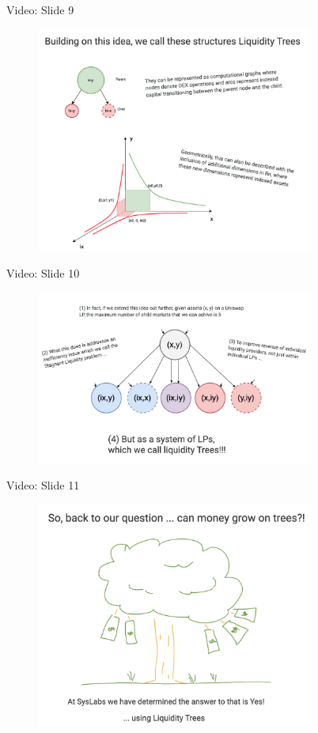 \documentclass[10pt,xcolor=svgnames]{beamer} %
\begin{document}
\begin{frame}{Video: Slide 9}
\begin{figure}[h!]
\includegraphics[width=3.6in]{img/slide9.png}
\label{fig:dex_forest}
\end{figure}
\end{frame}

\begin{frame}{Video: Slide 10}
\begin{figure}[h!]
\includegraphics[width=3.6in]{img/slide10.png}
\label{fig:dex_forest}
\end{figure}
\end{frame}

\begin{frame}{Video: Slide 11}
\begin{figure}[h!]
\includegraphics[width=3.6in]{img/slide11.png}
\label{fig:dex_forest}
\end{figure}
\end{frame}
\end{document}
